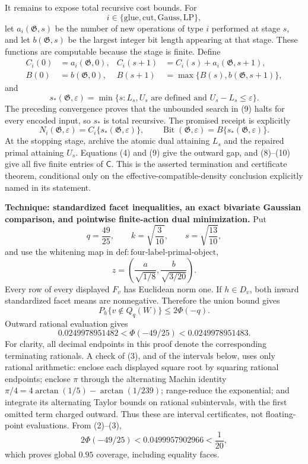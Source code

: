 It remains to expose total recursive cost bounds.  For
\[
 i\in\{\mathrm{glue},\mathrm{cut},\mathrm{Gauss},\mathrm{LP}\},
\]
let \(a_i(\mathfrak G,s)\) be the number of new operations of type \(i\)
performed at stage \(s\), and let \(b(\mathfrak G,s)\) be the largest
integer bit length appearing at that stage.  These functions are computable
because the stage is finite.  Define
\[
 \begin{aligned}
 C_i(0)&=a_i(\mathfrak G,0),&
 C_i(s+1)&=C_i(s)+a_i(\mathfrak G,s+1),\\
 B(0)&=b(\mathfrak G,0),&
 B(s+1)&=\max\{B(s),b(\mathfrak G,s+1)\},
 \end{aligned}
\tag{8}
\]
and
\[
 s_*(\mathfrak G,\varepsilon)=
 \min\{s:L_s,U_s\text{ are defined and }U_s-L_s\leq\varepsilon\}.
\tag{9}
\]
The preceding convergence proves that the unbounded search in (9) halts
for every encoded input, so \(s_*\) is total recursive.  The promised
receipt is explicitly
\[
 N_i(\mathfrak G,\varepsilon)=
 C_i\{s_*(\mathfrak G,\varepsilon)\},
 \qquad
 \operatorname{Bit}(\mathfrak G,\varepsilon)=
 B\{s_*(\mathfrak G,\varepsilon)\}.
\tag{10}
\]
At the stopping stage, archive the atomic dual attaining \(L_s\) and the
repaired primal attaining \(U_s\).  Equations (4) and (9) give the outward
gap, and (8)--(10) give all five finite entries of \(\mathsf C\).  This is
the asserted termination and certificate theorem, conditional only on the
effective-compatible-density conclusion explicitly named in its statement.

\textbf{Technique: standardized facet inequalities, an exact bivariate
Gaussian comparison, and pointwise finite-action dual minimization.}
Put
\[
 q=\frac{49}{25},\qquad k=\sqrt{\frac3{10}},\qquad
 s=\sqrt{\frac{13}{10}},
\]
and use the whitening map in
\(\mathrm{def:four\mbox{-}label\mbox{-}primal\mbox{-}object}\),
\[
 z=\left(\frac a{\sqrt{1/8}},\frac b{\sqrt{3/20}}\right).
\tag{1}
\]
Every row of every displayed \(F_v\) has Euclidean norm one.  If
\(h\in D_v\), both inward standardized facet means are nonnegative.
Therefore the union bound gives
\[
 P_h\{v\notin Q_q(W)\}\leq2\Phi(-q).
\tag{2}
\]
Outward rational evaluation gives
\[
 0.0249978951482
 <\Phi(-49/25)
 <0.0249978951483.
\tag{3}
\]
For clarity, all decimal endpoints in this proof denote the corresponding
terminating rationals.  A check of (3), and of the intervals below, uses
only rational arithmetic: enclose each displayed square root by squaring
rational endpoints; enclose \(\pi\) through the alternating Machin identity
\(\pi/4=4\arctan(1/5)-\arctan(1/239)\); range-reduce the exponential; and
integrate its alternating Taylor bounds on rational subintervals, with the
first omitted term charged outward.  Thus these are interval certificates,
not floating-point evaluations.  From (2)--(3),
\[
 2\Phi(-49/25)<0.0499957902966<\frac1{20},
\]
which proves global \(0.95\) coverage, including equality faces.

